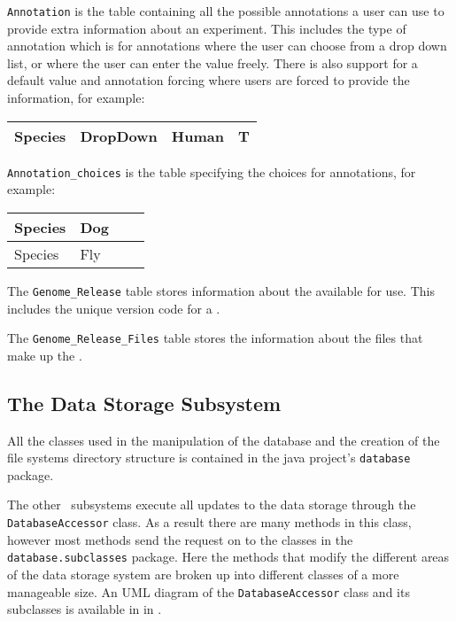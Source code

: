\texttt{Annotation} is the table containing all the possible annotations a user can use to provide extra information about an experiment. This includes the type of annotation which is  for annotations where the user can choose from a drop down list, or  where the user can enter the value freely. There is also support for a default value and annotation forcing where users are forced to provide the information, for example:
\begin{center}
  \begin{tabular}{| l | l | l | l|}
    \hline
    Species & DropDown & Human & T \\ \hline
  \end{tabular}
\end{center}

\texttt{Annotation\_choices} is the table specifying the choices for  annotations, for example:\\
\begin{center}
  \begin{tabular}{| l | l | l | l|}
    \hline
    Species & Dog \\ \hline
    Species & Fly \\ \hline
  \end{tabular}
\end{center}

The \texttt{Genome\_Release} table stores information about the  available for use. This includes the unique version code for a \cite{UCSCGRVERSION}.

The \texttt{Genome\_Release\_Files} table stores the information about the files that make up the .

\subsection{The Data Storage Subsystem}
All the classes used in the manipulation of the database and the creation of the file systems directory structure is contained in the java project's \texttt{database} package.

The other \appName\ subsystems execute all updates to the data storage through the \texttt{DatabaseAccessor} class. As a result there are many methods in this class, however most methods send the request on to the classes in the \texttt{database.subclasses} package. Here the methods that modify the different areas of the data storage system are broken up into different classes of a more manageable size. An UML diagram of the \texttt{DatabaseAccessor} class and its subclasses is available in  in  .

